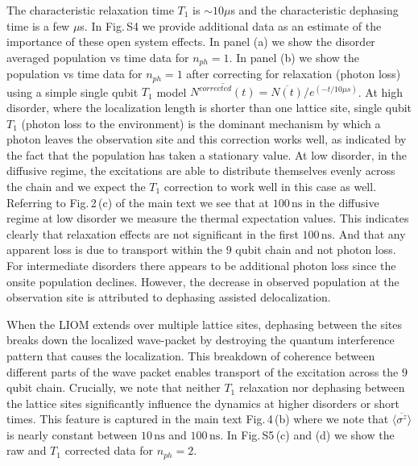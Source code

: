 The characteristic relaxation time $T_1$ is $\sim 10 \mu$s and the characteristic dephasing time is a few $\mu$s.
In Fig.\,S4 we provide additional data as an estimate of the importance of these open system effects.
In panel (a) we show the disorder averaged population vs time data for $n_{ph}=1$.
In panel (b) we show the population vs time data for $n_{ph}=1$ after correcting for relaxation (photon loss) using a simple single qubit $T_1$ model
$\overline{N^{corrected} \left( t \right)} = \overline{N \left( t \right)} / e^{\left( -t/10 \mu s \right) }$.
%
At high disorder, where the localization length is shorter than one lattice site,
single qubit $T_1$ (photon loss to the environment) is the dominant mechanism by which a photon leaves the observation site and this correction works well,
as indicated by the fact that the population has taken a stationary value.
%
At low disorder, in the diffusive regime, the excitations are able to distribute themselves evenly across the chain and we expect the $T_1$ correction to work well in this case as well.
Referring to Fig.\,2\,(c) of the main text we see that at $100 \, \text{ns}$ in the diffusive regime at low disorder we measure the thermal expectation values.
This indicates clearly that relaxation effects are not significant in the first $100 \, \text{ns}$.
And that any apparent loss is due to transport within the $9$ qubit chain and not photon loss.
%
For intermediate disorders there appears to be additional photon loss since the onsite population declines. However, the decrease in observed population at the observation site is attributed to dephasing assisted delocalization. \autocite{Znidaric2015, Levi2016, Fischer2016, Luschen2017, vanNieuwenburg2017}

When the LIOM extends over multiple lattice sites, dephasing between the sites breaks down the localized wave-packet by destroying the quantum interference pattern that causes the localization.
This breakdown of coherence between different parts of the wave packet enables transport of the excitation across the $9$ qubit chain.
Crucially, we note that neither $T_1$ relaxation nor dephasing between the lattice sites significantly influence the dynamics at higher disorders or short times.
This feature is captured in the main text Fig.\,4\,(b) where we note that $\overline{ \langle \sigma^{z} \rangle }$ is nearly constant between $10 \, \text{ns}$ and $100 \, \text{ns}$.
In Fig.\,S5\,(c) and (d) we show the raw and $T_1$ corrected data for $n_{ph}=2$.

